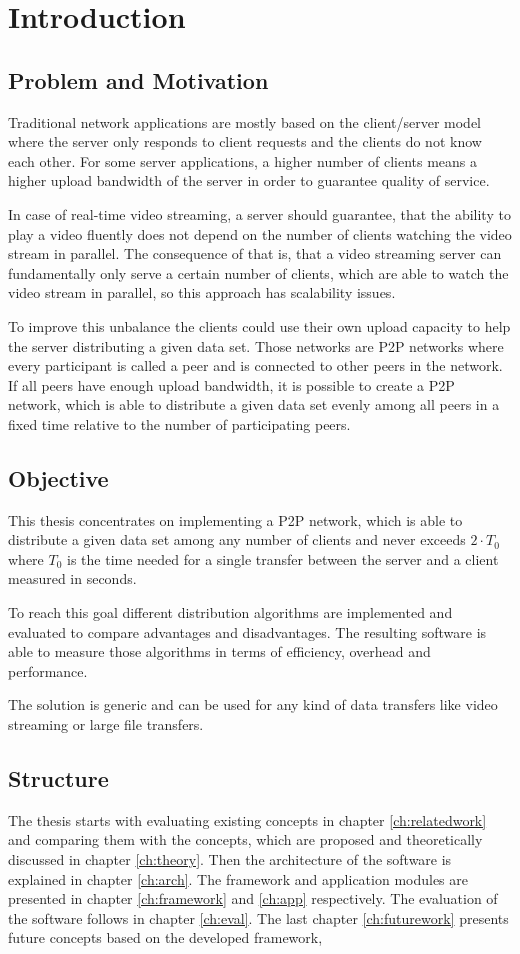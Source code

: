 \chapter{Introduction}
\section{Problem and Motivation}
Traditional network applications are mostly based on the client/server model where the server only responds to client requests and the clients do not know each other. 
For some server applications, a higher number of clients means a higher upload bandwidth of the server in order to guarantee quality of service.

In case of real-time video streaming, a server should guarantee, that the ability to play a video fluently does not depend on the number of clients watching the video stream in parallel. The consequence of that is, that a video streaming server can fundamentally only serve a certain number of clients, which are able to watch the video stream in parallel, so this approach has scalability issues.

To improve this unbalance the clients could use their own upload capacity to help the server distributing a given data set. Those networks are P2P networks where every participant is called a peer and is connected to other peers in the network. If all peers have enough upload bandwidth, it is possible to create a P2P network, which is able to distribute a given data set evenly among all peers in a fixed time relative to the number of participating peers.

\section{Objective}
This thesis concentrates on implementing a P2P network, which is able to distribute a given data set among any number of clients and never exceeds $2 \cdot T_0$ where $T_0$ is the time needed for a single transfer between the server and a client measured in seconds.

To reach this goal different distribution algorithms are implemented and evaluated to compare advantages and disadvantages. The resulting software is able to measure those algorithms in terms of efficiency, overhead and performance.

The solution is generic and can be used for any kind of data transfers like video streaming or large file transfers.

\section{Structure}
The thesis starts with evaluating existing concepts in chapter \ref{ch:relatedwork} and comparing them with the concepts, which are proposed and theoretically discussed in chapter \ref{ch:theory}. Then the architecture of the software is explained in chapter \ref{ch:arch}. The framework and application modules are presented in chapter \ref{ch:framework} and \ref{ch:app} respectively. The evaluation of the software follows in chapter \ref{ch:eval}. The last chapter \ref{ch:futurework} presents future concepts based on the developed framework,
